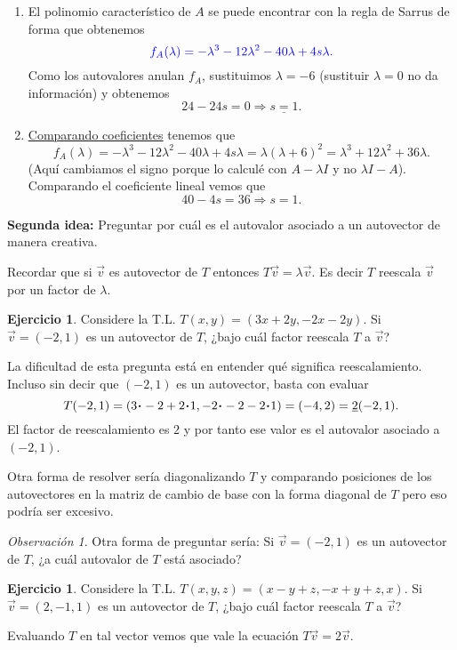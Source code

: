 \documentclass[12pt]{article}
\theoremstyle{plain}
\theoremstyle{definition}
\newtheorem{Ej}[Th]{Ejercicio}         %
\theoremstyle{remark}
\newtheorem*{Rmk}{Observación}      %
\newcommand{\la}{\lambda}           %
\renewcommand{\:}{\colon}           %
\newcommand{\un}[1]{\underline{#1}}
\renewcommand{\.}{\Cdot}                %
\newcommand{\To}{\Rightarrow}
\newcommand{\blu}[1]{\textcolor{blue}{#1}}
\begin{document}
\begin{enumerate}
  \item El polinomio característico de $A$ se puede encontrar con la regla de Sarrus de forma que obtenemos 
  $$\blu{f_A(\la)=-\la^3-12\la^2-40\la+4s\la.}$$
  Como los autovalores anulan $f_A$, sustituimos $\la=-6$ (sustituir $\la=0$ no da información) y obtenemos 
  $$24-24s=0\To \un{s=1}.$$
  \item \un{Comparando coeficientes} tenemos que 
  $$f_A(\la)=-\la^3-12\la^2-40\la+4s\la=\la(\la+6)^2=\la^3+12\la^2+36\la.$$
  (Aquí cambiamos el signo porque lo calculé con $A-\la I$ y no $\la I-A$). Comparando el coeficiente lineal vemos que 
  $$40-4s=36\To s=1.$$
\end{enumerate}
\newpage
\textbf{Segunda idea:} Preguntar por cuál es el autovalor asociado a un autovector de manera creativa.\par 
Recordar que si $\vec{v}$ es autovector de $T$ entonces $T\vec v=\la\vec{v}$. Es decir $T$ reescala $\vec v$ por un factor de $\la$.

\begin{Ej}
  Considere la T.L. $T(x,y)=(3x+2y,-2x-2y)$. Si $\vec{v}=(-2,1)$ es un autovector de $T$, ¿bajo cuál factor reescala $T$ a $\vec v$?
\end{Ej}

La dificultad de esta pregunta está en entender qué significa reescalamiento. Incluso sin decir que $(-2,1)$ es un autovector, basta con evaluar 
$$T(-2,1)=(3\.-2+2\.1,-2\.-2-2\.1)=(-4,2)=\un{2}(-2,1).$$
El factor de reescalamiento es $2$ y por tanto ese valor es el autovalor asociado a $(-2,1)$.\par 
Otra forma de resolver sería diagonalizando $T$ y comparando posiciones de los autovectores en la matriz de cambio de base con la forma diagonal de $T$ pero eso podría ser excesivo.

\begin{Rmk}
Otra forma de preguntar sería: Si $\vec{v}=(-2,1)$ es un autovector de $T$, ¿a cuál autovalor de $T$ está asociado?
\end{Rmk}

\begin{Ej}
  Considere la T.L. $T(x,y,z)=(x-y+z,-x+y+z,x)$. Si $\vec{v}=(2,-1,1)$ es un autovector de $T$, ¿bajo cuál factor reescala $T$ a $\vec v$?
\end{Ej}

Evaluando $T$ en tal vector vemos que vale la ecuación $T\vec v=2\vec v$.\vspace*{1em}
\end{document}
